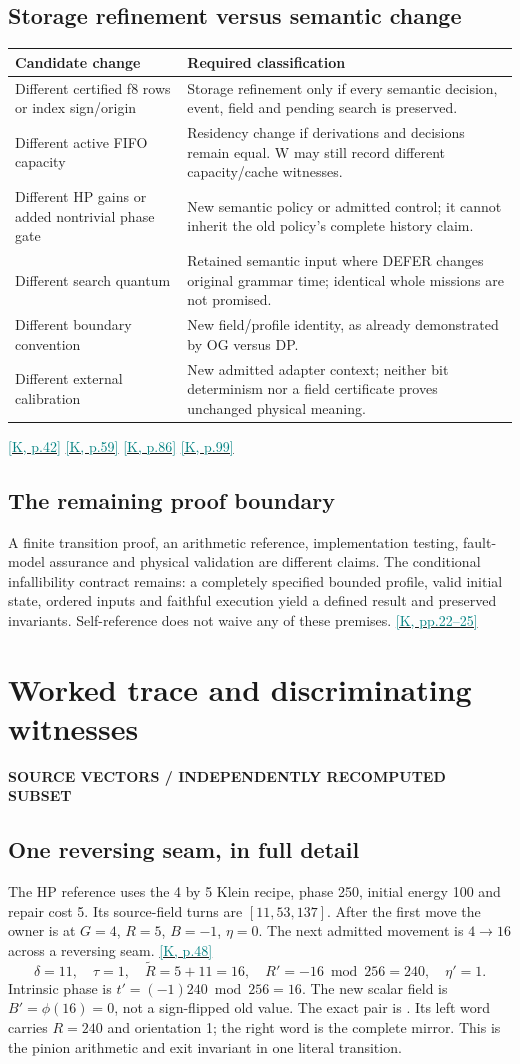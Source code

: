 \documentclass[11pt,a4paper]{article}
\newcommand{\kref}[1]{\hyperlink{baseline.#1}{\textcolor{teal}{[K, p.#1]}}}
\newcommand{\krange}[2]{\hyperlink{baseline.#1}{\textcolor{teal}{[K, pp.#1--#2]}}}
\newcommand{\status}[1]{{\sffamily\bfseries\scriptsize\color{teal}#1}\par}
\newcommand{\code}[1]{\texttt{\detokenize{#1}}}
\newcommand{\sectionstart}[1]{\par\addvspace{18pt}\Needspace{12\baselineskip}\section{#1}}
\theoremstyle{lpstyle}
\begin{document}
\subsection{Storage refinement versus semantic change}
\begin{tabularx}{\textwidth}{L{48mm}Y}
\toprule
\textbf{Candidate change}&\textbf{Required classification}\\\midrule
Different certified f8 rows or index sign/origin&Storage refinement only if every semantic decision, event, field and pending search is preserved.\\
Different active FIFO capacity&Residency change if derivations and decisions remain equal. W may still record different capacity/cache witnesses.\\
Different HP gains or added nontrivial phase gate&New semantic policy or admitted control; it cannot inherit the old policy's complete history claim.\\
Different search quantum&Retained semantic input where DEFER changes original grammar time; identical whole missions are not promised.\\
Different boundary convention&New field/profile identity, as already demonstrated by OG versus DP.\\
Different external calibration&New admitted adapter context; neither bit determinism nor a field certificate proves unchanged physical meaning.\\\bottomrule
\end{tabularx}
\kref{42} \kref{59} \kref{86} \kref{99}

\subsection{The remaining proof boundary}
A finite transition proof, an arithmetic reference, implementation testing, fault-model assurance and physical validation are different claims. The conditional infallibility contract remains: a completely specified bounded profile, valid initial state, ordered inputs and faithful execution yield a defined result and preserved invariants. Self-reference does not waive any of these premises. \krange{22}{25}

\sectionstart{Worked trace and discriminating witnesses}
\status{SOURCE VECTORS / INDEPENDENTLY RECOMPUTED SUBSET}
\subsection{One reversing seam, in full detail}
The HP reference uses the 4 by 5 Klein recipe, phase 250, initial energy 100 and repair cost 5. Its source-field turns are $[11,53,137]$. After the first move the owner is at $G=4$, $R=5$, $B=-1$, $\eta=0$. The next admitted movement is $4\to16$ across a reversing seam. \kref{48}
\[
\delta=11,\quad\tau=1,\quad\widetilde R=5+11=16,\quad
R'=-16\bmod256=240,\quad\eta'=1.
\]
Intrinsic phase is $t'=(-1)240\bmod256=16$. The new scalar field is $B'=\phi(16)=0$, not a sign-flipped old value. The exact pair is \code{81001010910010F0}. Its left word carries $R=240$ and orientation 1; the right word is the complete mirror. This is the pinion arithmetic and exit invariant in one literal transition.
\end{document}

